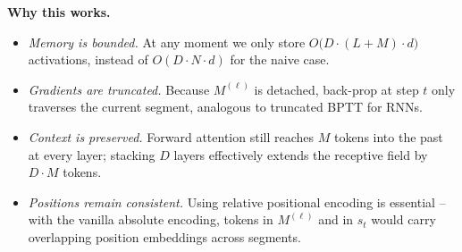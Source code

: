 \documentclass{article}
\begin{document}
{\begin{enumerate}
        \textbf{Why this works.}
        \begin{itemize}
            \item \emph{Memory is bounded.} At any moment we only store $O\bigl(D \cdot (L + M) \cdot d\bigr)$ activations, instead of $O(D \cdot N \cdot d)$ for the naive case.
            \item \emph{Gradients are truncated.} Because $M^{(\ell)}$ is detached, back-prop at step $t$ only traverses the current segment, analogous to truncated BPTT for RNNs.
            \item \emph{Context is preserved.} Forward attention still reaches $M$ tokens into the past at every layer; stacking $D$ layers effectively extends the receptive field by $D\cdot M$ tokens.
            \item \emph{Positions remain consistent.} Using relative positional encoding is essential -- with the vanilla absolute encoding, tokens in $M^{(\ell)}$ and in $s_t$ would carry overlapping position embeddings across segments.
        \end{itemize}
    \end{enumerate}
}
\end{document}
